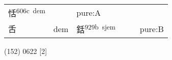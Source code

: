 \documentclass[14pt,a4paper]{scrartcl}
\begin{document}
\begin{longtable}[c]{@{}llllll@{}}
\begin{minipage}[t]{0.14\columnwidth}
恬\textsuperscript{606c~dem}
\strut\end{minipage} &
\begin{minipage}[t]{0.14\columnwidth}\raggedright\strut
\strut\end{minipage} &
\begin{minipage}[t]{0.14\columnwidth}\raggedright\strut
pure:A
\strut\end{minipage}\tabularnewline
\begin{minipage}[t]{0.14\columnwidth}\raggedright\strut
舌
\strut\end{minipage} &
\begin{minipage}[t]{0.14\columnwidth}\raggedright\strut
dem
\strut\end{minipage} &
\begin{minipage}[t]{0.14\columnwidth}\raggedright\strut
銛\textsuperscript{929b~sjem}
\strut\end{minipage} &
\begin{minipage}[t]{0.14\columnwidth}\raggedright\strut
\strut\end{minipage} &
\begin{minipage}[t]{0.14\columnwidth}\raggedright\strut
\strut\end{minipage} &
\begin{minipage}[t]{0.14\columnwidth}\raggedright\strut
pure:B
\strut\end{minipage}\tabularnewline
\bottomrule
\end{longtable}

(152) 0622 {[}2{]}
\end{document}
